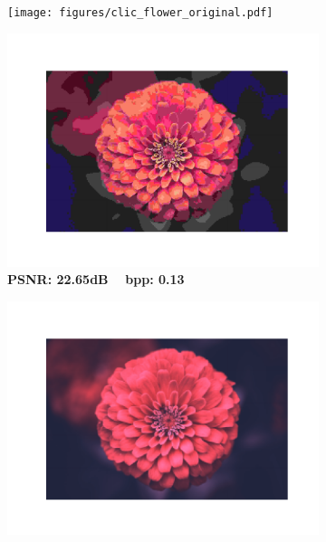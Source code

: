 \begin{figure}[t]
	
	\begin{subfigure}{.23\textwidth}
		\centering
		\texttt{[image: figures/clic\_flower\_original.pdf]}
		\vspace{-20pt}
		\caption*{}
	\end{subfigure}%
	\begin{subfigure}{.23\textwidth}
		\centering
		\includegraphics[trim=1.7cm 1.5cm 1.7cm 1.7cm, clip, width=1\textwidth]{figures/clic_flower_JPEG_bpp_0.137.pdf}
		\vspace{-20pt}
		\caption*{\tiny \textbf{PSNR: 22.65dB ~ bpp: 0.13}}
	\end{subfigure}
	\begin{subfigure}{.23\textwidth}
		\centering
		\includegraphics[trim=1.7cm 1.5cm 1.7cm 1.7cm, clip, width=1\textwidth]{figures/clic_flower_SVD_bpp_0.123.pdf}

\end{subfigure}
\end{figure}
